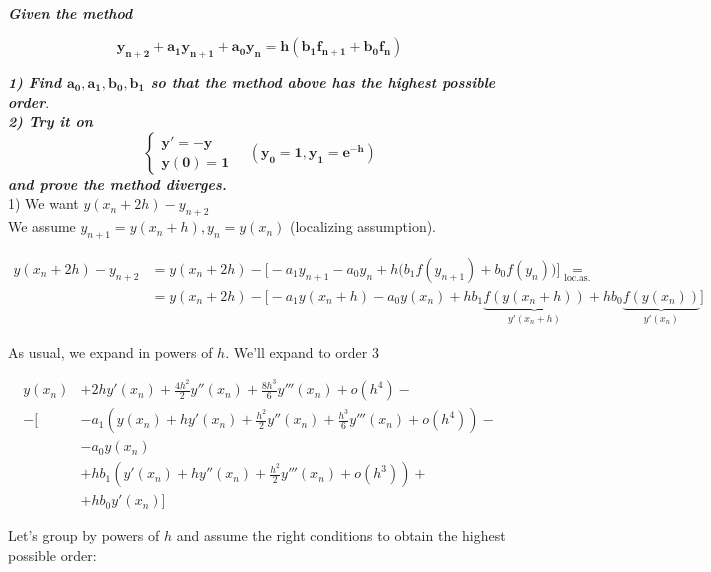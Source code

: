 \begin{example}
    \-\\
    \textit{\textbf{Given the method}}

    \[
      \boldsymbol{y_{n+2} + a_1y_{n+1} + a_0y_n = h(b_1f_{n+1} + b_0f_n)}
    \]
    
    \textit{\textbf{1) Find $\boldsymbol{a_0,a_1,b_0,b_1}$ so that the method above has the highest possible order}}.\\
    
   \textit{ \textbf{2) Try it on $$\boldsymbol{\begin{cases}y' = -y \\ y(0) = 1\end{cases}}\quad (\boldsymbol{y_0=1, y_1=e^{-h}})$$
    and prove the method diverges.}}\\
    
    1) We want $y(x_n + 2h) - y_{n+2}$ \\
    
    We assume $y_{n+1} = y(x_n + h), y_n = y(x_n)$ (localizing assumption).
    
    
    \begin{align*}
        y(x_n + 2h) - y_{n+2} &= y(x_n + 2h) - \Big[-a_1y_{n+1} - a_0y_n + h\big(b_1f(y_{n+1}) + b_0f(y_n)\big) \Big]\underset{\text{loc.as.}}{=}\\
        &= y(x_n + 2h) - \Big[-a_1y(x_n+h) - a_0y(x_n) + hb_1\underbrace{f\left(y(x_n+h)\right)}_{y'(x_n + h)} + hb_0\underbrace{f\left(y(x_n)\right)}_{y'(x_n)} \Big]
    \end{align*}
    
    As usual, we expand in powers of $h$. We'll expand to order 3
    
    \begin{align*}
        y(x_n) &+ 2hy'(x_n) + \frac{4h^2}{2}y''(x_n) + \frac{8h^3}{6}y'''(x_n) + o(h^4) - \\
        -\bigg[ &-a_1\left(y(x_n) + hy'(x_n) + \frac{h^2}{2}y''(x_n) + \frac{h^3}{6}y'''(x_n) + o(h^4)\right) - \\
        &-a_0y(x_n) \\
        &+hb_1\left(y'(x_n) + hy''(x_n) + \frac{h^2}{2}y'''(x_n) + o(h^3) \right) + \\
        &+hb_0y'(x_n)\bigg]
    \end{align*}
    
    \newpage
    
    Let's group by powers of $h$ and assume the right conditions to obtain the highest possible order:\\
    

\end{example}

